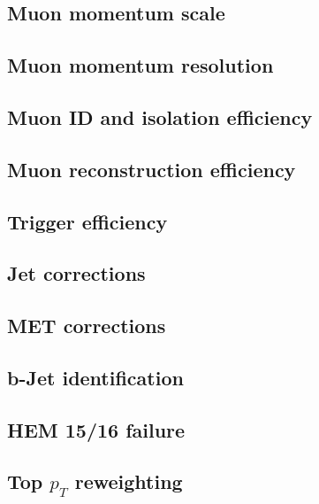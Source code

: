 \subsection{Muon momentum scale} \label{sec:MES}


\subsection{Muon momentum resolution} \label{sec:MER}


\subsection{Muon ID and isolation efficiency} \label{sec:MuonIDIsoEff}


\subsection{Muon reconstruction efficiency} \label{sec:MuonRecoEff}


\subsection{Trigger efficiency} \label{sec:MuonHLTEff}


\subsection{Jet corrections} \label{sec:JEC}


\subsection{MET corrections} \label{sec:METCorr}


\subsection{b-Jet identification} \label{sec:BJetID}


\subsection{HEM 15/16 failure} \label{sec:HEM1516Failure}


\subsection{Top \texorpdfstring{$p_T$}{pT} reweighting} \label{sec:TopPtReweighting}


